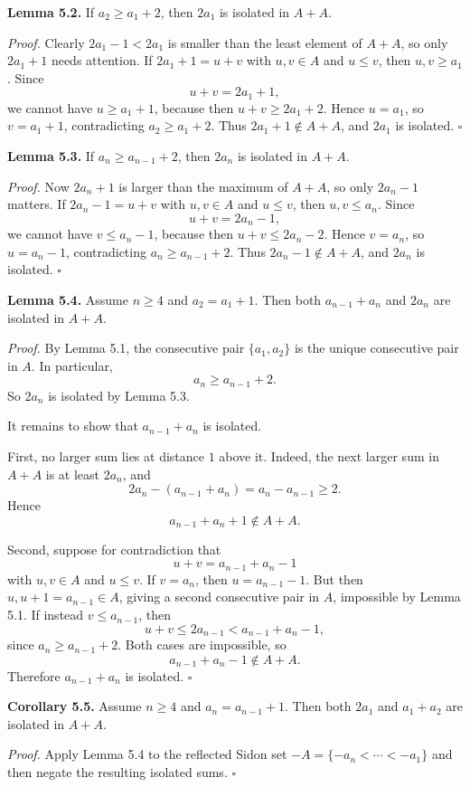 \medskip
\noindent\textbf{Lemma 5.2.}
If $a_2\ge a_1+2$, then $2a_1$ is isolated in $A+A$.

\smallskip
\noindent\emph{Proof.}
Clearly $2a_1-1<2a_1$ is smaller than the least element of $A+A$, so only $2a_1+1$ needs attention.
If $2a_1+1=u+v$ with $u,v\in A$ and $u\le v$, then $u,v\ge a_1$.  Since
\[
u+v=2a_1+1,
\]
we cannot have $u\ge a_1+1$, because then $u+v\ge 2a_1+2$.  Hence $u=a_1$, so $v=a_1+1$, contradicting $a_2\ge a_1+2$.  Thus $2a_1+1\notin A+A$, and $2a_1$ is isolated. \hfill$\square$

\medskip
\noindent\textbf{Lemma 5.3.}
If $a_n\ge a_{n-1}+2$, then $2a_n$ is isolated in $A+A$.

\smallskip
\noindent\emph{Proof.}
Now $2a_n+1$ is larger than the maximum of $A+A$, so only $2a_n-1$ matters.  If $2a_n-1=u+v$ with $u,v\in A$ and $u\le v$, then $u,v\le a_n$.  Since
\[
u+v=2a_n-1,
\]
we cannot have $v\le a_n-1$, because then $u+v\le 2a_n-2$.  Hence $v=a_n$, so $u=a_n-1$, contradicting $a_n\ge a_{n-1}+2$.  Thus $2a_n-1\notin A+A$, and $2a_n$ is isolated. \hfill$\square$

\medskip
\noindent\textbf{Lemma 5.4.}
Assume $n\ge 4$ and $a_2=a_1+1$.  Then both $a_{n-1}+a_n$ and $2a_n$ are isolated in $A+A$.

\smallskip
\noindent\emph{Proof.}
By Lemma 5.1, the consecutive pair $\{a_1,a_2\}$ is the unique consecutive pair in $A$.  In particular,
\[
a_n\ge a_{n-1}+2.
\]
So $2a_n$ is isolated by Lemma 5.3.

It remains to show that $a_{n-1}+a_n$ is isolated.

First, no larger sum lies at distance $1$ above it.  Indeed, the next larger sum in $A+A$ is at least $2a_n$, and
\[
2a_n-(a_{n-1}+a_n)=a_n-a_{n-1}\ge 2.
\]
Hence
\[
a_{n-1}+a_n+1\notin A+A.
\]

Second, suppose for contradiction that
\[
u+v=a_{n-1}+a_n-1
\]
with $u,v\in A$ and $u\le v$.
If $v=a_n$, then $u=a_{n-1}-1$.  But then $u,u+1=a_{n-1}\in A$, giving a second consecutive pair in $A$, impossible by Lemma 5.1.
If instead $v\le a_{n-1}$, then
\[
u+v\le 2a_{n-1}<a_{n-1}+a_n-1,
\]
since $a_n\ge a_{n-1}+2$.
Both cases are impossible, so
\[
a_{n-1}+a_n-1\notin A+A.
\]
Therefore $a_{n-1}+a_n$ is isolated. \hfill$\square$

\medskip
\noindent\textbf{Corollary 5.5.}
Assume $n\ge 4$ and $a_n=a_{n-1}+1$.  Then both $2a_1$ and $a_1+a_2$ are isolated in $A+A$.

\smallskip
\noindent\emph{Proof.}
Apply Lemma 5.4 to the reflected Sidon set $-A=\{-a_n<\cdots<-a_1\}$ and then negate the resulting isolated sums. \hfill$\square$

